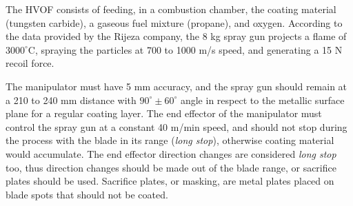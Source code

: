 The HVOF consists of feeding, in a combustion chamber, the coating material
(tungsten carbide), a gaseous fuel mixture (propane), and oxygen. According to
the data provided by the Rijeza company, the 8 kg spray gun projects a flame of
$3000^\circ$C, spraying the particles at 700 to 1000 m/s speed, and
generating a 15 N recoil force.

The manipulator must have 5 mm accuracy, and the spray gun should remain
at a 210 to 240 mm distance with $90^\circ\pm 60^\circ$ angle in respect to the metallic
surface plane for a regular coating layer. The end effector of the manipulator
must control the spray gun at a constant 40 m/min speed, and should not stop during the process with
the blade in its range (\textit{long stop}), otherwise coating material would
accumulate.
The end effector direction changes are considered \textit{long stop} too, thus
direction changes should be made out of the blade range, or sacrifice plates
should be used. Sacrifice plates, or masking, are metal plates placed on blade
spots that should not be coated. 

 

